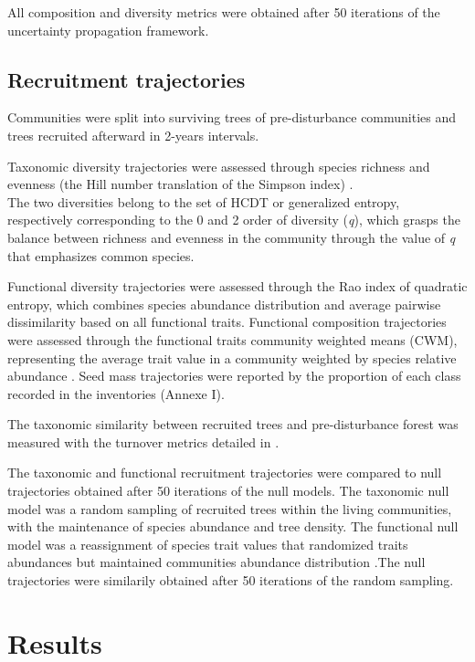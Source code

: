 \documentclass[fleqn,10pt]{ArtEcoFoG} %
\begin{document}
All composition and diversity metrics were obtained after 50 iterations
of the uncertainty propagation framework.

\subsection{Recruitment trajectories}\label{recruitment-trajectories}

Communities were split into surviving trees of pre-disturbance
communities and trees recruited afterward in 2-years intervals.

Taxonomic diversity trajectories were assessed through species richness
and evenness (the Hill number translation of the Simpson index)
\citep{Hill1973, chao2015, Marcon2015b}.\\
The two diversities belong to the set of HCDT or generalized entropy,
respectively corresponding to the 0 and 2 order of diversity (\emph{q}),
which grasps the balance between richness and evenness in the community
through the value of \emph{q} that emphasizes common species.

Functional diversity trajectories were assessed through the Rao index of
quadratic entropy, which combines species abundance distribution and
average pairwise dissimilarity based on all functional traits.
Functional composition trajectories were assessed through the functional
traits community weighted means (CWM), representing the average trait
value in a community weighted by species relative abundance
\citep{Diaz2007, Garnier2004, Mason2013}. Seed mass trajectories were
reported by the proportion of each class recorded in the inventories
(Annexe I).

The taxonomic similarity between recruited trees and pre-disturbance
forest was measured with the turnover metrics detailed in
\citet{Podani2013a}.

The taxonomic and functional recruitment trajectories were compared to
null trajectories obtained after 50 iterations of the null models. The
taxonomic null model was a random sampling of recruited trees within the
living communities, with the maintenance of species abundance and tree
density. The functional null model was a reassignment of species trait
values that randomized traits abundances but maintained communities
abundance distribution \citep{Mason2013}.The null trajectories were
similarily obtained after 50 iterations of the random sampling.

\section{Results}\label{results}
\end{document}
